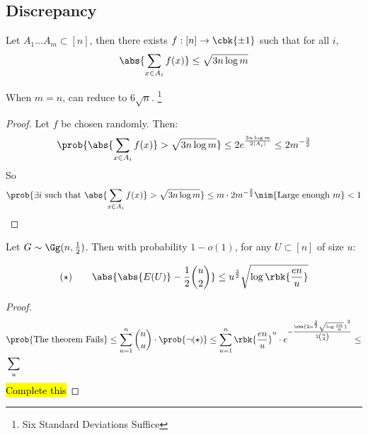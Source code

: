 \documentclass[a4paper, 11pt, oneside]{book}
\begin{document}
	\subsection{Discrepancy}
	\begin{thm}\label{thm: Discrepancy}
		Let $A_1\ldots A_m\subset [n]$, then there exists $f:[n]\to \cbk{\pm1}$ such that for all $i$,  
		\[
		\abs{\sum_{x\in A_i} f(x)}\le \sqrt{3n\log m}
		\]
	\end{thm}
	\begin{remark}
		[Spencer] When $m=n$,
		can reduce to $6\sqrt{n}$. \footnote{Six Standard Deviations Suffice}
 	\end{remark}
 	\begin{proof}
 		Let $f$ be chosen randomly. Then:
 		\[
 		\prob{\abs{\sum_{x\in A_i}f(x)} > \sqrt{3n\log m}} \le 2e^{\frac{3n\log m}{2|A_i|}}\le 2m^{-\frac{3}{2}}
 		\]
 		So
 		\[\prob{\exists i \text{ such that } \abs{\sum_{x\in A_i}f(x)} > \sqrt{3n\log m}} \le m\cdot 2m^{-\frac32}\nim{\text{Large enough } m} < 1
 		\]
 	\end{proof}
 	\begin{thm}\label{them: disc 2}
 		Let $G\sim \Gg(n,\frac{1}{2})$. Then with probability $1-o(1)$, for any $U\subset [n]$ of size $u$:
 		
 		\[
 		(\star) \qquad \abs{\abs{E(U)}-\frac{1}{2}{u\choose 2}}\le u^{\frac32}\sqrt{\log\rbk{\frac{en}{u}}}
 		\]
 	\end{thm}
 	\begin{proof}
 		\begin{align*}
 			&\prob{\text{The theorem Fails}} \le \sum_{u=1}^n{n\choose u}\cdot\prob{\neg (\star)} \le \sum_{u=1}^n\rbk{\frac{en}{u}}^u\cdot e^{-\frac{\rbk{2u^\frac32\sqrt{\log\frac{en}{u}}}^2}{2{u\choose 2}}} \le \\
 			&\sum_u
 		\end{align*}
 		\hl{Complete this}
 	\end{proof}
\end{document}
